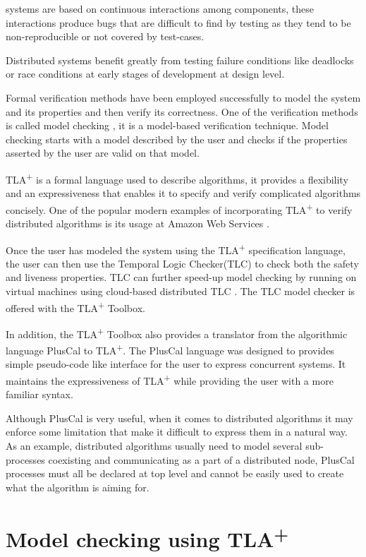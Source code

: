\documentclass[journal]{IEEEtran}
\newcommand{\tlaplus}{TLA\textsuperscript{+}\xspace}
\begin{document}
 systems are based on continuous interactions among components, these interactions produce bugs that are difficult to find by testing as they tend to be non-reproducible or not covered by test-cases.

Distributed systems benefit greatly from testing failure conditions like deadlocks or race conditions at early stages of development at design level.

Formal verification methods have been employed successfully to model the system and its properties and then verify its correctness. One of the verification methods is called model checking \cite{ModelCheckingTLA}, it is a model-based verification technique. Model checking starts with a model described by the user and checks if the properties asserted by the user are valid on that model. 

\tlaplus is a formal language used to describe algorithms, it provides a flexibility and an expressiveness that enables it to specify and verify complicated algorithms concisely. One of the popular modern examples of incorporating \tlaplus to verify distributed algorithms is its usage at Amazon Web Services \cite{amazon}.

Once the user has modeled the system using the \tlaplus specification language, the user can then use the Temporal Logic Checker(TLC) to check both the safety and liveness properties. TLC can further speed-up model checking by running on virtual machines using cloud-based distributed TLC \cite{cloudTLC}. The TLC model checker is offered with the \tlaplus Toolbox. 

In addition, the \tlaplus Toolbox also provides a translator from the algorithmic language PlusCal to \tlaplus. The PlusCal language was designed to provides simple pseudo-code like interface for the user to express concurrent systems. It maintains the expressiveness of \tlaplus while providing the user with a more familiar syntax.

Although PlusCal is very useful, when it comes to distributed algorithms it may enforce some limitation that make it difficult to express them in a natural way. As an example, distributed algorithms usually need to model several sub-processes coexisting and communicating as a part of a distributed node, PlusCal processes must all be declared at top level and cannot be easily used to create what the algorithm is aiming for. 


\section{Model checking using \tlaplus}
\end{document}
